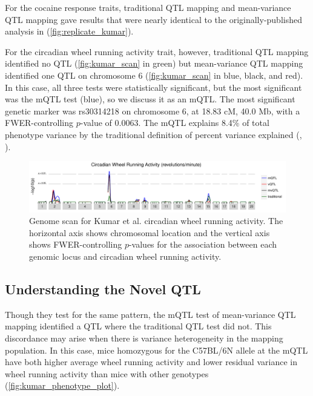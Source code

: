     For the cocaine response traits, traditional QTL mapping and mean-variance QTL mapping
    gave results that were nearly identical to the originally-published analysis in \citet{Kumar2013} (\autoref{fig:replicate_kumar}). 

    For the circadian wheel running activity trait, however, traditional QTL mapping identified no QTL (\autoref{fig:kumar_scan} in green) but mean-variance QTL mapping identified one QTL on chromosome 6 (\autoref{fig:kumar_scan} in blue, black, and red).
    In this case, all three tests were statistically significant, but the most significant was the mQTL test (blue), so we discuss it as an mQTL.
    The most significant genetic marker was rs30314218 on chromosome 6, at 18.83 cM, 40.0 Mb, with a FWER-controlling $p$-value of 0.0063.
    The mQTL explains 8.4\% of total phenotype variance by the traditional definition of percent variance explained (\eg, \citealt{Broman2009}).

    \begin{figure}
      \includegraphics[width=\linewidth]{images/Kumar_avg_counts_scan.pdf}
      \caption[
      Genome scan for Kumar et al. circadian wheel running activity.
      ]
      {
        Genome scan for Kumar et al. circadian wheel running activity.
        The horizontal axis shows chromosomal location and the vertical axis shows FWER-controlling $p$-values for the association between each genomic locus and circadian wheel running activity.
      }
      \label{fig:kumar_scan}
    \end{figure}


    \subsection{Understanding the Novel QTL}
    Though they test for the same pattern, the mQTL test of mean-variance QTL mapping identified a QTL where the traditional QTL test did not.
    This discordance may arise when there is variance heterogeneity in the mapping population.
    In this case, mice homozygous for the C57BL/6N allele at the mQTL have both higher average wheel running activity and lower residual variance in wheel running activity than mice with other genotypes (\autoref{fig:kumar_phenotype_plot}).

